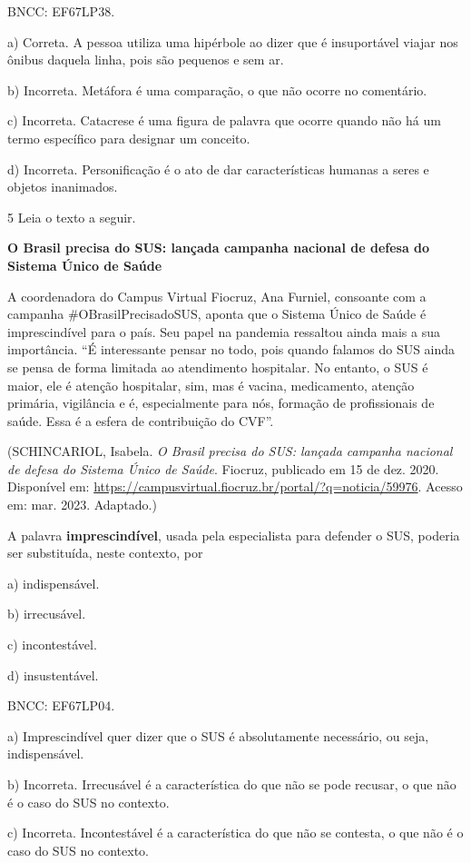 BNCC: EF67LP38.

a) Correta. A pessoa utiliza uma hipérbole ao dizer que é insuportável
viajar nos ônibus daquela linha, pois são pequenos e sem ar.

b) Incorreta. Metáfora é uma comparação, o que não ocorre no comentário.

c) Incorreta. Catacrese é uma figura de palavra que ocorre quando não há
um termo específico para designar um conceito.

d) Incorreta. Personificação é o ato de dar características humanas a
seres e objetos inanimados.

\num{5} Leia o texto a seguir.

\textbf{O Brasil precisa do SUS: lançada campanha nacional de defesa do
Sistema Único de Saúde}

A coordenadora do Campus Virtual Fiocruz, Ana Furniel, consoante com a
campanha \#OBrasilPrecisadoSUS, aponta que o Sistema Único de Saúde é
imprescindível para o país. Seu papel na pandemia ressaltou ainda mais a
sua importância. ``É interessante pensar no todo, pois quando falamos do
SUS ainda se pensa de forma limitada ao atendimento hospitalar. No
entanto, o SUS é maior, ele é atenção hospitalar, sim, mas é vacina,
medicamento, atenção primária, vigilância e é, especialmente para nós,
formação de profissionais de saúde. Essa é a esfera de contribuição do
CVF''.

(SCHINCARIOL, Isabela. \emph{O Brasil precisa do SUS: lançada campanha
nacional de defesa do Sistema Único de Saúde}. Fiocruz, publicado em 15
de dez. 2020. Disponível em: 
\url{https://campusvirtual.fiocruz.br/portal/?q=noticia/59976}.
Acesso em: mar. 2023. Adaptado.)

A palavra \textbf{imprescindível}, usada pela especialista para defender
o SUS, poderia ser substituída, neste contexto, por

a) indispensável.

b) irrecusável.

c) incontestável.

d) insustentável.

BNCC: EF67LP04.

a) Imprescindível quer dizer que o SUS é absolutamente necessário, ou
seja, indispensável.

b) Incorreta. Irrecusável é a característica do que não se pode recusar,
o que não é o caso do SUS no contexto.

c) Incorreta. Incontestável é a característica do que não se contesta, o
que não é o caso do SUS no contexto.

